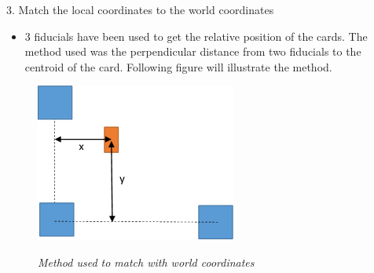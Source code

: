 3.	Match the local coordinates to the world coordinates
\begin{itemize}
	\item 3 fiducials have been used to get the relative position of the cards. The method used was the perpendicular distance from two fiducials to the centroid of the card. Following figure will illustrate the method.
	
\end{itemize}
\begin{figure}[position = here]
	\begin{centering}
		\includegraphics[scale=0.8]{./sachiths_images/image4.png}\\
		\caption[]{\textit{Method used to match with world coordinates}}
	\end{centering}
\end{figure}

